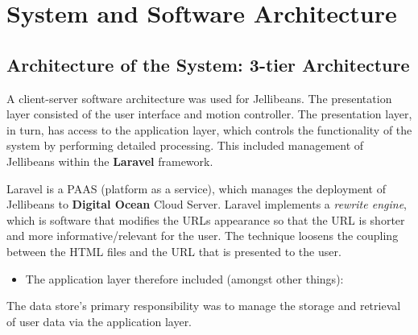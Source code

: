 \documentclass[a4paper, 11pt]{article}
\begin{document}
\section{System and Software Architecture}

\subsection{Architecture of the System: 3-tier Architecture}
A client-server software architecture was used for Jellibeans. The presentation layer consisted of the user interface and motion controller. The presentation layer, in turn, has access to the application layer, which controls the functionality of the system by performing detailed processing. This included management of Jellibeans within the \textbf{Laravel} framework. 

\vspace{5mm}
Laravel is a PAAS (platform as a service), which manages the deployment of Jellibeans to \textbf{Digital Ocean} Cloud Server. Laravel implements a \textit{rewrite engine}, which is software that modifies the URLs appearance so that the URL is shorter and more informative/relevant for the user. The technique loosens the coupling between the HTML files and the URL that is presented to the user.

\vspace{5mm}
\begin{itemize}
\item{The application layer therefore included (amongst other things):}
\end{itemize}

The data store's primary responsibility was to manage the storage and retrieval of user data via the application layer.
\end{document}

